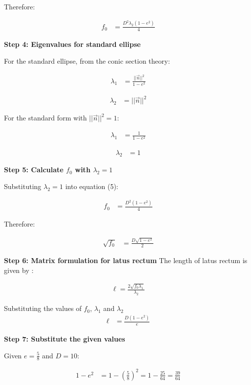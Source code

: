 \documentclass[journal]{IEEEtran}
\begin{document}
Therefore:

\begin{align}
f_0 &= \frac{D^2 \lambda_2(1-e^2)}{4}
\end{align}

\textbf{Step 4: Eigenvalues for standard ellipse}

For the standard ellipse, from the conic section theory:

\begin{align}
\lambda_1 &= \frac{||\vec{n}||^2}{1-e^2}
\end{align}

\begin{align}
\lambda_2 &= ||\vec{n}||^2
\end{align}

For the standard form with $||\vec{n}||^2 = 1$:

\begin{align}
\lambda_1 &= \frac{1}{1-e^2}
\end{align}

\begin{align}
\lambda_2 &= 1
\end{align}

\textbf{Step 5: Calculate $f_0$ with $\lambda_2 = 1$}

Substituting $\lambda_2 = 1$ into equation (5):

\begin{align}
f_0 &= \frac{D^2(1-e^2)}{4}
\end{align}

Therefore:

\begin{align}
\sqrt{f_0} &= \frac{D\sqrt{1-e^2}}{2}
\end{align}

\textbf{Step 6: Matrix formulation for latus rectum}
The length of latus rectum is given by :

\begin{align}
\ell = \frac{2\sqrt{f_0 \lambda_1}}{\lambda_2}
\end{align}

Substituting the values of $f_0$, $\lambda_1$ and $\lambda_2$ 
\begin{align}
\ell &= \frac{D(1-e^2)}{e}
\end{align}

\textbf{Step 7: Substitute the given values}

Given $e = \frac{5}{8}$ and $D = 10$:

\begin{align}
1 - e^2 &= 1 - \left(\frac{5}{8}\right)^2 = 1 - \frac{25}{64} = \frac{39}{64}
\end{align}
\end{document}
